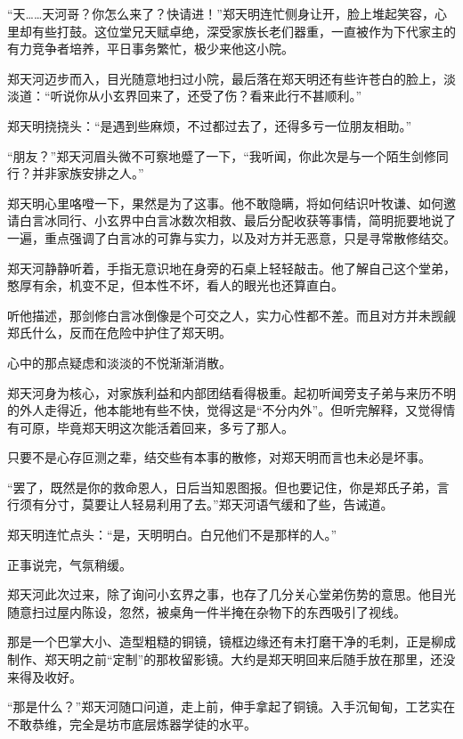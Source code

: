 “天……天河哥？你怎么来了？快请进！”郑天明连忙侧身让开，脸上堆起笑容，心里却有些打鼓。这位堂兄天赋卓绝，深受家族长老们器重，一直被作为下代家主的有力竞争者培养，平日事务繁忙，极少来他这小院。

郑天河迈步而入，目光随意地扫过小院，最后落在郑天明还有些许苍白的脸上，淡淡道：“听说你从小玄界回来了，还受了伤？看来此行不甚顺利。”

郑天明挠挠头：“是遇到些麻烦，不过都过去了，还得多亏一位朋友相助。”

“朋友？”郑天河眉头微不可察地蹙了一下，“我听闻，你此次是与一个陌生剑修同行？并非家族安排之人。”

郑天明心里咯噔一下，果然是为了这事。他不敢隐瞒，将如何结识叶牧谦、如何邀请白言冰同行、小玄界中白言冰数次相救、最后分配收获等事情，简明扼要地说了一遍，重点强调了白言冰的可靠与实力，以及对方并无恶意，只是寻常散修结交。

郑天河静静听着，手指无意识地在身旁的石桌上轻轻敲击。他了解自己这个堂弟，憨厚有余，机变不足，但本性不坏，看人的眼光也还算直白。

听他描述，那剑修白言冰倒像是个可交之人，实力心性都不差。而且对方并未觊觎郑氏什么，反而在危险中护住了郑天明。

心中的那点疑虑和淡淡的不悦渐渐消散。

郑天河身为核心，对家族利益和内部团结看得极重。起初听闻旁支子弟与来历不明的外人走得近，他本能地有些不快，觉得这是“不分内外”。但听完解释，又觉得情有可原，毕竟郑天明这次能活着回来，多亏了那人。

只要不是心存叵测之辈，结交些有本事的散修，对郑天明而言也未必是坏事。

“罢了，既然是你的救命恩人，日后当知恩图报。但也要记住，你是郑氏子弟，言行须有分寸，莫要让人轻易利用了去。”郑天河语气缓和了些，告诫道。

郑天明连忙点头：“是，天明明白。白兄他们不是那样的人。”

\vspace{2em}

正事说完，气氛稍缓。

郑天河此次过来，除了询问小玄界之事，也存了几分关心堂弟伤势的意思。他目光随意扫过屋内陈设，忽然，被桌角一件半掩在杂物下的东西吸引了视线。

那是一个巴掌大小、造型粗糙的铜镜，镜框边缘还有未打磨干净的毛刺，正是柳成制作、郑天明之前“定制”的那枚留影镜。大约是郑天明回来后随手放在那里，还没来得及收好。

“那是什么？”郑天河随口问道，走上前，伸手拿起了铜镜。入手沉甸甸，工艺实在不敢恭维，完全是坊市底层炼器学徒的水平。

